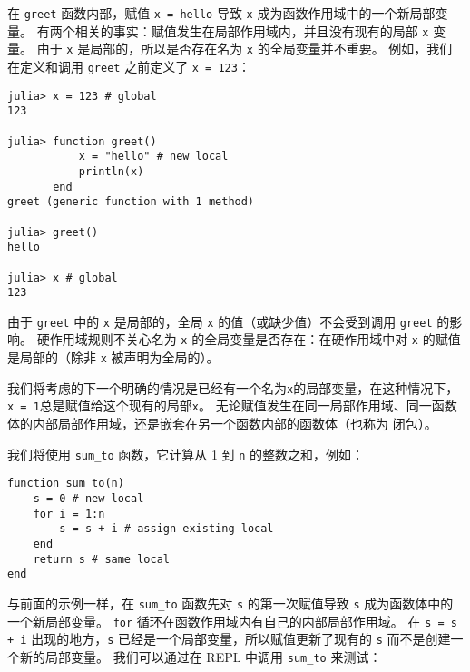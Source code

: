 在 \texttt{greet} 函数内部，赋值 \texttt{x = {\textquotedbl}hello{\textquotedbl}} 导致 \texttt{x} 成为函数作用域中的一个新局部变量。 有两个相关的事实：赋值发生在局部作用域内，并且没有现有的局部 \texttt{x} 变量。 由于 \texttt{x} 是局部的，所以是否存在名为 \texttt{x} 的全局变量并不重要。 例如，我们在定义和调用 \texttt{greet} 之前定义了 \texttt{x = 123}：




\begin{verbatim}
julia> x = 123 # global
123

julia> function greet()
           x = "hello" # new local
           println(x)
       end
greet (generic function with 1 method)

julia> greet()
hello

julia> x # global
123
\end{verbatim}



由于 \texttt{greet} 中的 \texttt{x} 是局部的，全局 \texttt{x} 的值（或缺少值）不会受到调用 \texttt{greet} 的影响。 硬作用域规则不关心名为 \texttt{x} 的全局变量是否存在：在硬作用域中对 \texttt{x} 的赋值是局部的（除非 \texttt{x} 被声明为全局的）。



我们将考虑的下一个明确的情况是已经有一个名为\texttt{x}的局部变量，在这种情况下，\texttt{x = 1}总是赋值给这个现有的局部\texttt{x}。 无论赋值发生在同一局部作用域、同一函数体的内部局部作用域，还是嵌套在另一个函数内部的函数体（也称为 \href{https://en.wikipedia.org/wiki/Closure\_(computer\_programming)}{闭包}）。



我们将使用 \texttt{sum\_to} 函数，它计算从 1 到 \texttt{n} 的整数之和，例如：




\begin{verbatim}
function sum_to(n)
    s = 0 # new local
    for i = 1:n
        s = s + i # assign existing local
    end
    return s # same local
end
\end{verbatim}



与前面的示例一样，在 \texttt{sum\_to} 函数先对 \texttt{s} 的第一次赋值导致 \texttt{s} 成为函数体中的一个新局部变量。 \texttt{for} 循环在函数作用域内有自己的内部局部作用域。 在 \texttt{s = s + i} 出现的地方，\texttt{s} 已经是一个局部变量，所以赋值更新了现有的 \texttt{s} 而不是创建一个新的局部变量。 我们可以通过在 REPL 中调用 \texttt{sum\_to} 来测试：




